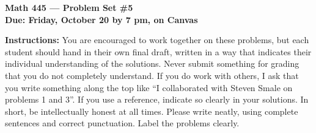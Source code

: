 \documentclass{amsart}
\begin{document}
\begin{center}
{\large\bfseries
Math 445 --- Problem Set \#5 \\
Due: Friday, October 20 by 7 pm, on Canvas}
\end{center}





{\bf Instructions:} You are encouraged to work together on these
problems, but each student should hand in their own final draft,
written in a way that indicates their individual understanding of
the solutions. Never submit something for grading
that you do not completely understand. If you do work with others, I ask that you write something along the
top like ``I collaborated with Steven Smale on problems 1 and 3''.
If you use a reference, indicate so clearly in your solutions. 
In short, be intellectually
honest at all times. Please write neatly, using complete sentences and correct
punctuation. Label the problems clearly. 
\end{document}
